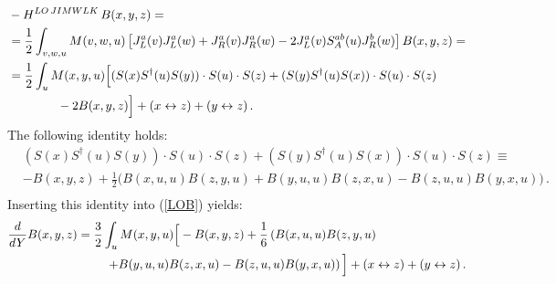 \documentclass[11pt,a4paper]{article}
\begin{document}
\begin{equation}\begin{split}\label{LOB}
&-H^{LO\, JIMWLK}\,B(x,y,z)= \\
&={1\over 2}\int_{v,w,u}M(v,w,u)\left[J_{L}^{a}(v)J_{L}^{a}(w)+J_{R}^{a}(v)J_{R}^{a}(w)-2J_{L}^{a}(v)S_A^{ab}(u)J_{R}^{b}(w)\right]B(x,y,z)=\\
&={1\over 2}\int_{u}M(x,y,u)\Big[(S(x)S^{\dagger}(u)S(y))\cdot S(u)\cdot S(z)+(S(y)S^{\dagger}(u)S(x))\cdot S(u)\cdot S(z) \\
& \ \ \ \ \ \ \  \ \ \ \ \ -2B(x,y,z)\Big]+(x\leftrightarrow z) +(y\leftrightarrow z)\,.
  \end{split}\end{equation}
The following identity \cite{Grab} holds:
\begin{equation}\begin{split}\label{Grabidentity}
&(S(x)S^{\dagger}(u)S(y))\cdot S(u)\cdot S(z)+(S(y)S^{\dagger}(u)S(x))\cdot S(u)\cdot S(z)\equiv \\
&-B(x,y,z)+\frac{1}{2}\Big(B(x,u,u)B(z,y,u)+B(y,u,u)B(z,x,u)-B(z,u,u)B(y,x,u)\Big)\,.\\
\end{split}\end{equation}
Inserting this identity into (\ref{LOB}) yields:
\begin{equation}\begin{split}
&{d\over dY} B(x,y,z)={3\over 2} \int_{u}M(x,y,u)\Big[-B(x,y,z)+\frac{1}{6}\left(B(x,u,u)B(z,y,u)\right.\\ 
&\left.\ \ \ \ \ \ \ \ \ \ \ \ \ \ \ \ \ \ \ \ \ \ \ \ +B(y,u,u)B(z,x,u)-B(z,u,u)B(y,x,u)\right)\Big]+(x\leftrightarrow z) +(y\leftrightarrow z)\,.\\
 \end{split}\end{equation}
\end{document}
